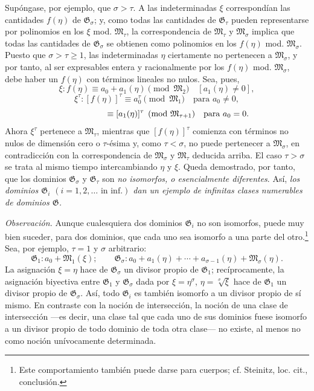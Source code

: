 \documentclass[11pt]{article}
\begin{document}
Supóngase, por ejemplo, que $\sigma>\tau$. A las indeterminadas $\xi$ correspondían las cantidades $f(\eta)$ de $\mathfrak G_\sigma$; y, como todas las cantidades de $\mathfrak G_\tau$ pueden representarse por polinomios en los $\xi$ mod. $\mathfrak M_\tau$, la correspondencia de $\mathfrak M_\tau$ y $\mathfrak M_\sigma$ implica que todas las cantidades de $\mathfrak G_\sigma$ se obtienen como polinomios en los $f(\eta)$ mod. $\mathfrak M_\sigma$. Puesto que $\sigma>\tau\ge1$, las indeterminadas $\eta$ ciertamente no pertenecen a $\mathfrak M_\sigma$, y por tanto, al ser expresables entera y racionalmente por los $f(\eta)$ mod. $\mathfrak M_\sigma$, debe haber un $f(\eta)$ con términos lineales no nulos. Sea, pues,
\[
 \xi:f(\eta)\equiv a_0+a_1(\eta)\pmod{\mathfrak M_2}\quad[a_1(\eta)\ne0],
\]
\[
 \xi^\tau:[f(\eta)]^\tau\equiv a_0^\tau\pmod{\mathfrak M_1}\quad\text{para }a_0\ne0,
\]
\[
 \hphantom{\xi^\tau:[f(\eta)]^\tau}\equiv [a_1(\eta)]^\tau
 \pmod{\mathfrak M_{\tau+1}}\quad\text{para }a_0=0.
\]
Ahora $\xi^\tau$ pertenece a $\mathfrak M_\tau$, mientras que $[f(\eta)]^\tau$ comienza con términos no nulos de dimensión cero o $\tau$-ésima y, como $\tau<\sigma$, no puede pertenecer a $\mathfrak M_\sigma$, en contradicción con la correspondencia de $\mathfrak M_\sigma$ y $\mathfrak M_\tau$ deducida arriba. El caso $\tau>\sigma$ se trata al mismo tiempo intercambiando $\eta$ y $\xi$. Queda demostrado, por tanto, que los dominios $\mathfrak G_\sigma$ y $\mathfrak G_\tau$ son \emph{no isomorfos, o esencialmente diferentes}. Así, \emph{los dominios $\mathfrak G_i$ $(i=1,2,\ldots\text{ in inf.})$ dan un ejemplo de infinitas clases numerables de dominios $\mathfrak G$.}

\emph{Observación.} Aunque cualesquiera dos dominios $\mathfrak G_i$ no son isomorfos, puede muy bien suceder, para dos dominios, que cada uno sea isomorfo a una parte del otro.\footnote{Este comportamiento también puede darse para cuerpos; cf. Steinitz, loc. cit., conclusión.} Sea, por ejemplo, $\tau=1$ y $\sigma$ arbitrario:
\[
\mathfrak G_1:a_0+\mathfrak M_1(\xi);\qquad
\mathfrak G_\sigma:a_0+a_1(\eta)+\cdots+a_{\sigma-1}(\eta)+\mathfrak M_\sigma(\eta).
\]
La asignación $\xi=\eta$ hace de $\mathfrak G_\sigma$ un divisor propio de $\mathfrak G_1$; recíprocamente, la asignación biyectiva entre $\mathfrak G_1$ y $\mathfrak G_\sigma$ dada por $\xi=\eta^\sigma$, $\eta=\sqrt[\sigma]{\xi}$ hace de $\mathfrak G_1$ un divisor propio de $\mathfrak G_\sigma$. Así, todo $\mathfrak G_i$ es también isomorfo a un divisor propio de sí mismo. En contraste con la noción de intersección, la noción de una clase de intersección ---es decir, una clase tal que cada uno de sus dominios fuese isomorfo a un divisor propio de todo dominio de toda otra clase--- no existe, al menos no como noción unívocamente determinada.
\end{document}

